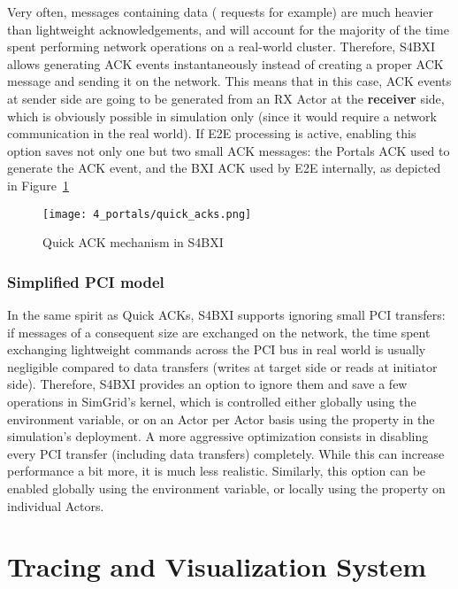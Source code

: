 Very often, messages containing data ( requests for example) are
much heavier than lightweight acknowledgements, and will account for the
majority of the time spent performing network operations on a real-world
cluster. Therefore, S4BXI allows generating ACK events instantaneously instead
of creating a proper ACK message and sending it on the network. This means that
in this case, ACK events at sender side are going to be generated from an RX
Actor at the \textbf{receiver} side, which is obviously possible in simulation
only (since it would require a network communication in the real world). If E2E
processing is active, enabling this option saves not only one but two small ACK
messages: the Portals ACK used to generate the ACK event, and the BXI ACK used
by E2E internally, as depicted in Figure~\ref{fig:4_portals:quick_acks}

\begin{figure}[!ht]
    \centering
    \texttt{[image: 4\_portals/quick\_acks.png]}
    \caption{Quick ACK mechanism in S4BXI}
    \label{fig:4_portals:quick_acks}
\end{figure}

\subsubsection{Simplified PCI model}

In the same spirit as Quick ACKs, S4BXI supports ignoring small PCI transfers:
if messages of a consequent size are exchanged on the network, the time spent
exchanging lightweight commands across the PCI bus in real world is usually
negligible compared to data transfers (writes at target side or reads at
initiator side). Therefore, S4BXI provides an option to ignore them and save a
few operations in SimGrid's kernel, which is controlled either globally using
the  environment variable, or on an Actor per
Actor basis using the  property in the simulation's
deployment. A more aggressive optimization consists in disabling every PCI
transfer (including data transfers) completely. While this can increase
performance a bit more, it is much less realistic. Similarly, this option can be
enabled globally using the  environment variable, or
locally using the  property on individual Actors.

\section{Tracing and Visualization System}

